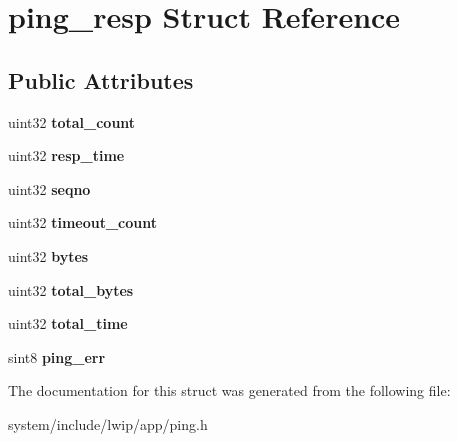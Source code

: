 \hypertarget{structping__resp}{}\section{ping\+\_\+resp Struct Reference}
\label{structping__resp}
\subsection*{Public Attributes}
\begin{DoxyCompactItemize}
\item 
\hypertarget{structping__resp_a6fa551dcaa02b1972bcb033a77d9c3fb}{}uint32 {\bfseries total\+\_\+count}\label{structping__resp_a6fa551dcaa02b1972bcb033a77d9c3fb}

\item 
\hypertarget{structping__resp_aa3d8544071979aa91c63dfc0965266ee}{}uint32 {\bfseries resp\+\_\+time}\label{structping__resp_aa3d8544071979aa91c63dfc0965266ee}

\item 
\hypertarget{structping__resp_a7f98b4759b001fff0de971272a67520b}{}uint32 {\bfseries seqno}\label{structping__resp_a7f98b4759b001fff0de971272a67520b}

\item 
\hypertarget{structping__resp_a8374619f387f89cfd63dc103a7bc13f9}{}uint32 {\bfseries timeout\+\_\+count}\label{structping__resp_a8374619f387f89cfd63dc103a7bc13f9}

\item 
\hypertarget{structping__resp_a04b0cdcd564844cc5625e59e13b37102}{}uint32 {\bfseries bytes}\label{structping__resp_a04b0cdcd564844cc5625e59e13b37102}

\item 
\hypertarget{structping__resp_a58cb7aa28712969e0163f32a934e3a02}{}uint32 {\bfseries total\+\_\+bytes}\label{structping__resp_a58cb7aa28712969e0163f32a934e3a02}

\item 
\hypertarget{structping__resp_a7d5bf320e3d8b1621532b520ee4e2bc1}{}uint32 {\bfseries total\+\_\+time}\label{structping__resp_a7d5bf320e3d8b1621532b520ee4e2bc1}

\item 
\hypertarget{structping__resp_acd57b9c77bf5aab9f049df33a66e0e65}{}sint8 {\bfseries ping\+\_\+err}\label{structping__resp_acd57b9c77bf5aab9f049df33a66e0e65}

\end{DoxyCompactItemize}


The documentation for this struct was generated from the following file\+:\begin{DoxyCompactItemize}
\item 
system/include/lwip/app/ping.\+h\end{DoxyCompactItemize}

